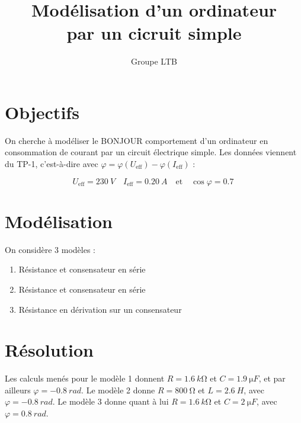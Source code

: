 \documentclass{article}
\title{Modélisation d'un ordinateur\\
\small{par un cicruit simple}}
\author{Groupe LTB}
\newcommand{\eff}{_\text{eff}}
\begin{document}
\maketitle

\section{Objectifs}

On cherche à modéliser le BONJOUR comportement d'un ordinateur en consommation de courant par un circuit électrique simple. Les données viennent du TP-1, c'est-à-dire avec $\varphi = \varphi(U\eff) - \varphi(I\eff)$ :

$$U\eff = \SI{230}{V} \quad I\eff = \SI{0,20}{A} \quad \text{et} \quad \cos \varphi = \SI{0,7}{}$$

\section{Modélisation}

On considère 3 modèles :
\begin{enumerate}
    \item Résistance et consensateur en série
    \item Résistance et consensateur en série
    \item Résistance en dérivation sur un consensateur
\end{enumerate}

\section{Résolution}

Les calculs menés pour le modèle 1 donnent $R = \SI{1,6}{k\ohm}$ et $C = \SI{1,9}{\micro F}$, et par ailleurs $\varphi = \SI{-0,8}{rad}$.
Le modèle 2 donne $R = \SI{800}{\ohm}$ et $L = \SI{2,6}{H}$, avec $\varphi = \SI{-0,8}{rad}$.
Le modèle 3 donne quant à lui $R = \SI{1,6}{k\ohm}$ et $C = \SI{2}{\micro F}$, avec $\varphi = \SI{0,8}{rad}$.
\end{document}
